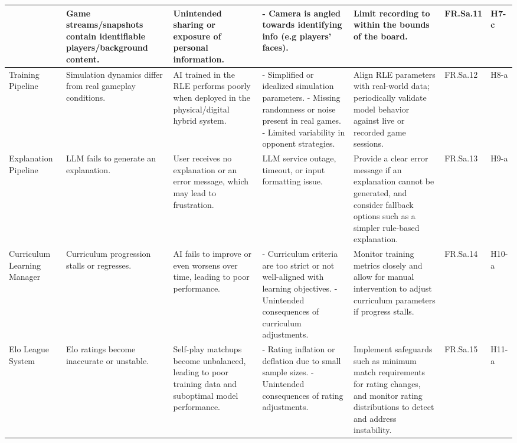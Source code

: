 \documentclass{article}
\begin{document}
\begin{landscape}
\begin{tabularx}{\linewidth}{|P{2.3cm}|Y|Y|Y|Y|P{1.4cm}|P{0.8cm}|}
        &
        Game streams/snapshots contain identifiable players/background content. &
        Unintended sharing or exposure of personal information. &
        - Camera is angled towards identifying info (e.g players' faces). &
        Limit recording to within the bounds of the board. &
        FR.Sa.11 &
        H7-c \\

        \hline

        Training Pipeline &
        Simulation dynamics differ from real gameplay conditions. &
        AI trained in the RLE performs poorly when deployed in the physical/digital hybrid system. &
        - Simplified or idealized simulation parameters. \newline - Missing randomness or noise present in real games. \newline - Limited variability in opponent strategies. &
        Align RLE parameters with real-world data; periodically validate model behavior against live or recorded game sessions. &
        FR.Sa.12 &
        H8-a \\

        \hline

        Explanation Pipeline &
        LLM fails to generate an explanation. &
        User receives no explanation or an error message, which may lead to frustration. &
        LLM service outage, timeout, or input formatting issue. &
        Provide a clear error message if an explanation cannot be generated, and consider fallback options such as a simpler rule-based explanation. &
        FR.Sa.13 &
        H9-a \\

        \hline

        Curriculum Learning Manager &
        Curriculum progression stalls or regresses. &
        AI fails to improve or even worsens over time, leading to poor performance. &
        - Curriculum criteria are too strict or not well-aligned with learning objectives. \newline - Unintended consequences of curriculum adjustments. &
        Monitor training metrics closely and allow for manual intervention to adjust curriculum parameters if progress stalls. &
        FR.Sa.14 &
        H10-a \\

        \hline

        Elo League System &
        Elo ratings become inaccurate or unstable. &
        Self-play matchups become unbalanced, leading to poor training data and suboptimal model performance. &
        - Rating inflation or deflation due to small sample sizes. \newline - Unintended consequences of rating adjustments. &
        Implement safeguards such as minimum match requirements for rating changes, and monitor rating distributions to detect and address instability. &
        FR.Sa.15 &
        H11-a \\
    \end{tabularx}
\end{landscape}
\end{document}
